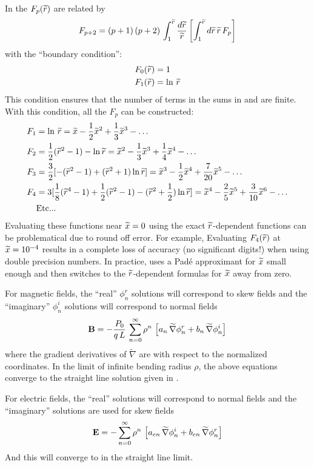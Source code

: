 In  the $F_p({\widetilde r})$ are related by
\begin{equation}
  F_{p+2} = (p + 1) \, (p + 2) \, \int_1^{{\widetilde r}} \frac{d{\widetilde r}}{{\widetilde r}} 
  \left[ \int_1^{{\widetilde r}} d{\widetilde r} \, {\widetilde r} \, F_{p} \right]
\end{equation}
with the ``boundary condition'':
\begin{align}
  F_0({\widetilde r}) &= 1 \nonumber \\
  F_1({\widetilde r}) &= \ln \, {\widetilde r}
\end{align}
This condition ensures that the number of terms in the sums in  and 
are finite. With this condition, all the $F_p$ can be constructed:
\begin{align}
  F_1 &= \ln \, {\widetilde r} = {\widetilde x} - \frac{1}{2}{\widetilde x}^2 + \frac{1}{3}{\widetilde x}^3 - \ldots \nonumber \\
  F_2 &= \frac{1}{2} ({\widetilde r}^2 - 1) - \ln {\widetilde r} = {\widetilde x}^2 - \frac{1}{3}{\widetilde x}^3 + \frac{1}{4} {\widetilde x}^4 - \ldots \nonumber \\
  F_3 &= \frac{3}{2} [-({\widetilde r}^2 - 1) + ({\widetilde r}^2 + 1) \ln {\widetilde r}] = {\widetilde x}^3 - \frac{1}{2} {\widetilde x}^4 + \frac{7}{20} {\widetilde x}^5 - \ldots 
         \label{ffff} \\
  F_4 &= 3 [ \frac{1}{8} ({\widetilde r}^4 - 1) + \frac{1}{2} ({\widetilde r}^2 - 1) - ({\widetilde r}^2 + \frac{1}{2}) \ln {\widetilde r}] = 
         {\widetilde x}^4 - \frac{2}{5} {\widetilde x}^5 + \frac{3}{10} {\widetilde x}^6 - \ldots \nonumber \\
  &\text{Etc...} \nonumber
\end{align}
Evaluating these functions near ${\widetilde x} = 0$ using the exact ${\widetilde r}$-dependent functions can be
problematical due to round off error. For example, Evaluating $F_4({\widetilde r})$ at ${\widetilde x} = 10^{-4}$ results
in a complete loss of accuracy (no significant digits!) when using double precision numbers. In
practice, \bmad uses a Pad\'e approximant for ${\widetilde x}$ small enough and then switches to the
${\widetilde r}$-dependent formulas for ${\widetilde x}$ away from zero.

For magnetic fields, the ``real'' $\phi_n^r$ solutions will correspond to skew fields and the
``imaginary'' $\phi_n^i$ solutions will correspond to normal fields
\begin{equation}
  {\bf B} = -\frac{P_0}{q \, L} \, 
    \sum_{n = 0}^\infty \rho^n \, \left[ a_n \, \widetilde \nabla \phi_n^r + b_n \, \widetilde \nabla \phi_n^i \right]
  \label{bpql}
\end{equation}
where the gradient derivatives of $\widetilde \nabla$ are with respect to the normalized
coordinates. In the limit of infinite bending radius $\rho$, the above equations converge
to the straight line solution given in .

For electric fields, the ``real'' solutions will correspond to normal fields and the
``imaginary'' solutions are used for skew fields
\begin{equation}
  {\bf E} = -\sum_{n = 0}^\infty \rho^n \, \left[ a_{en} \, \widetilde \nabla \phi_n^i + 
  b_{en} \, \widetilde \nabla \phi_n^r \right]
  \label{enrn}
\end{equation}
And this will converge to  in the straight line limit.

